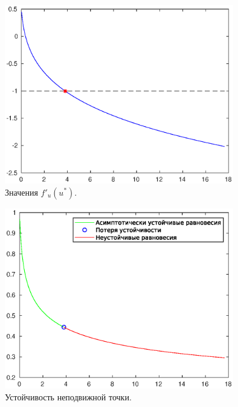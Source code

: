 \documentclass[16pt]{article}
\begin{document}
\begin{center}
\begin{figure}[h]
\center
\includegraphics[width=100mm]{der.eps}
\caption{Значения $f'_u(u^*)$.}
\end{figure}
\begin{figure}[h]
\center
\includegraphics[width=100mm]{equils.eps}
\caption{Устойчивость неподвижной точки.}
\end{figure}

\end{center}

\newpage
\end{document}
